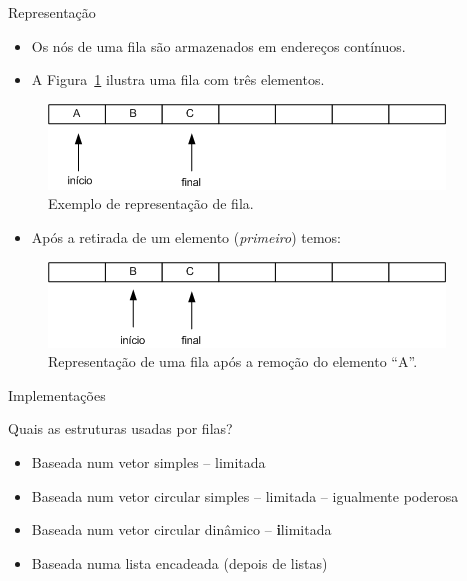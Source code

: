 
\begin{frame}{Representação}

\begin{itemize}
	\item Os nós de uma fila são armazenados em endereços contínuos.	
	\item A Figura~\ref{fig:fila-representacao} ilustra uma fila com três elementos.
\end{itemize}

\begin{figure}[ht!]
				\centering
				\includegraphics[width=.6\textwidth]{figs/fig_filas/exemplo_fila_tres_elementos.png}
				\caption{Exemplo de representação de fila.}
				\label{fig:fila-representacao}
			\end{figure} 

\begin{itemize}
	\item Após a retirada de um elemento (\textit{primeiro}) temos:

\end{itemize}

	\begin{figure}[hb!]
					\centering
				\includegraphics[width=.6\textwidth]{figs/fig_filas/exemplo_fila_tres_retirada.png}
				\caption{Representação de uma fila após a remoção do elemento ``A''.}	
	\end{figure} 

 \end{frame}

\begin{frame}{Implementações}

\begin{block}{Quais as estruturas usadas por filas?}
  \begin{itemize}
    \item Baseada num vetor simples -- limitada
    \item Baseada num vetor circular simples -- limitada -- igualmente poderosa
    \item Baseada num vetor circular dinâmico -- \textbf{i}limitada
    \item Baseada numa lista encadeada (depois de listas)
    
  \end{itemize}
\end{block}

\end{frame}


